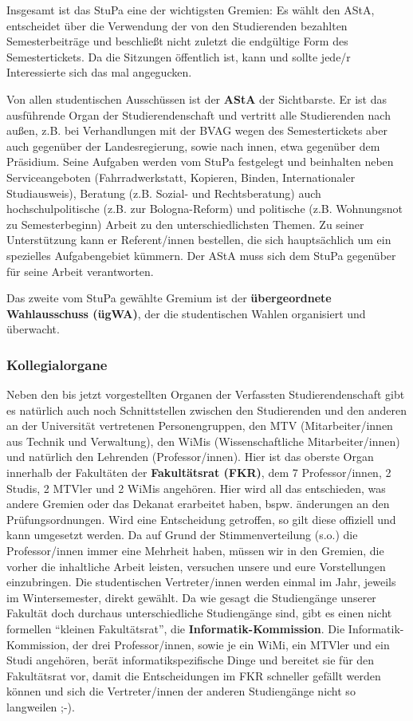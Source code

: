 Insgesamt ist das StuPa eine der wichtigsten Gremien: Es wählt den AStA, entscheidet über die Verwendung der von den Studierenden bezahlten Semesterbeiträge 
und beschließt nicht zuletzt die endgültige Form des Semestertickets. 
Da die Sitzungen öffentlich ist, kann und sollte jede/r Interessierte sich das mal angegucken.

Von allen studentischen Ausschüssen ist der \textbf{AStA}  der
Sichtbarste. Er ist das ausführende Organ der 
Studierendenschaft und vertritt alle Studierenden nach außen, z.B. bei
Verhandlungen mit der BVAG wegen des Semestertickets aber auch gegenüber der 
Landesregierung, sowie nach innen, etwa gegenüber dem Präsidium. Seine Aufgaben werden vom 
StuPa festgelegt und beinhalten neben Serviceangeboten (Fahrradwerkstatt, Kopieren, Binden, 
Internationaler Studiausweis), Beratung (z.B. Sozial- und Rechtsberatung) auch hochschulpolitische 
(z.B. zur Bologna-Reform) und politische (z.B. Wohnungsnot zu Semesterbeginn) Arbeit zu den 
unterschiedlichsten Themen. Zu seiner Unterstützung kann er Referent/innen 
bestellen, die sich hauptsächlich um ein spezielles Aufgabengebiet kümmern.
Der AStA muss sich dem StuPa gegenüber für seine Arbeit verantworten.

Das zweite vom StuPa gewählte Gremium ist der \textbf{übergeordnete 
Wahlausschuss (ügWA)}, der die studentischen Wahlen organisiert und überwacht.

\subsubsection*{Kollegialorgane}

Neben den bis jetzt vorgestellten Organen der Verfassten Studierendenschaft 
gibt es natürlich auch noch Schnittstellen zwischen den Studierenden und den anderen 
an der Universität vertretenen Personengruppen, den MTV (Mitarbeiter/innen 
aus Technik und Verwaltung), den WiMis (Wissenschaftliche Mitarbeiter/innen) und natürlich den Lehrenden (Professor/innen). Hier ist das 
oberste Organ innerhalb der Fakultäten der \textbf{Fakultätsrat (FKR)}, 
dem 7 Professor/innen, 2 Studis, 2 MTVler und 2 WiMis angehören. Hier wird all das 
entschieden, was andere Gremien oder das Dekanat erarbeitet haben, bspw. 
änderungen an den Prüfungsordnungen. Wird eine Entscheidung getroffen, so gilt diese offiziell und kann umgesetzt werden. Da auf Grund der 
Stimmenverteilung (s.o.) die Professor/innen immer eine Mehrheit haben, müssen wir 
in den Gremien, die vorher die inhaltliche Arbeit leisten, versuchen unsere 
und eure Vorstellungen einzubringen. Die studentischen 
Vertreter/innen werden einmal im Jahr, jeweils im Wintersemester, direkt gewählt. Da 
wie gesagt die Studiengänge unserer Fakultät doch durchaus unterschiedliche 
Studiengänge sind, gibt es einen nicht formellen "`kleinen Fakultätsrat"', 
die \textbf{Informatik-Kommission}. Die Informatik-Kommission, der drei Professor/innen, 
sowie je ein WiMi, ein MTVler und ein Studi angehören, berät informatikspezifische Dinge und 
bereitet sie für den Fakultätsrat vor, damit die Entscheidungen im FKR 
schneller gefällt werden können und sich die Vertreter/innen der anderen Studiengänge nicht so langweilen 
;-).

